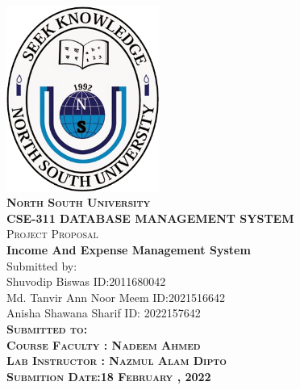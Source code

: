\begin{titlepage}

\newcommand{\HRule}{\rule{\linewidth}{0.3mm}}
\center

\includegraphics[width=50mm]{nsu.png}\\
\vspace{0.3cm}
\textsc{\LARGE \bfseries North South University}\\[0.5cm] %
\vspace{0.3cm}
\textsc{\large \bfseries CSE-311 DATABASE MANAGEMENT SYSTEM}\\
\textsc{Project Proposal} \\[0.2cm]
\vspace{0.3cm}
\Large \textbf{Income And Expense Management System}\\[0.5cm]

\vspace{0.2cm}
Submitted by:\\
Shuvodip Biswas ID:2011680042         \\[0.1cm]
 Md. Tanvir Ann Noor Meem ID:2021516642\\[0.1cm]
    Anisha Shawana Sharif ID: 2022157642\\[0.1cm]
\bfseries
\vspace{0.5cm}
\textsc{Submitted to:}\\
\textsc{Course Faculty : Nadeem Ahmed}\\
\textsc{Lab Instructor : Nazmul Alam Dipto}\\[0.5cm]

\textsc{Submition Date:18 February , 2022}
\usepackage{https://github.com/Dip-Biswas/CSE311}

\vfill
\end{titlepage}
